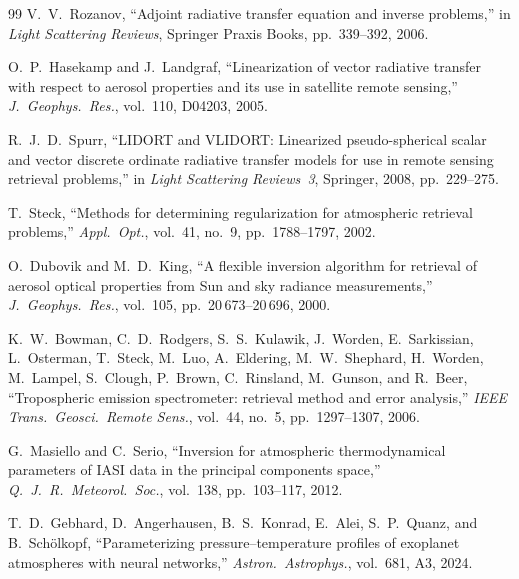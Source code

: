 \documentclass[11pt,a4paper]{article}
\theoremstyle{definition}
\begin{document}
\begin{thebibliography}{99}
  V.~V.~Rozanov,
  ``Adjoint radiative transfer equation and inverse problems,''
  in \emph{Light Scattering Reviews}, Springer Praxis Books,
  pp.~339--392, 2006.

  O.~P.~Hasekamp and J.~Landgraf,
  ``Linearization of vector radiative transfer with respect to aerosol
  properties and its use in satellite remote sensing,''
  \emph{J.\ Geophys.\ Res.}, vol.~110, D04203, 2005.

  R.~J.~D.~Spurr,
  ``LIDORT and VLIDORT: Linearized pseudo-spherical scalar and vector
  discrete ordinate radiative transfer models for use in remote sensing
  retrieval problems,''
  in \emph{Light Scattering Reviews~3}, Springer, 2008, pp.~229--275.

  T.~Steck,
  ``Methods for determining regularization for atmospheric retrieval
  problems,''
  \emph{Appl.\ Opt.}, vol.~41, no.~9, pp.~1788--1797, 2002.

  O.~Dubovik and M.~D.~King,
  ``A flexible inversion algorithm for retrieval of aerosol optical
  properties from Sun and sky radiance measurements,''
  \emph{J.\ Geophys.\ Res.}, vol.~105, pp.~20\,673--20\,696, 2000.

  K.~W.~Bowman, C.~D.~Rodgers, S.~S.~Kulawik, J.~Worden,
  E.~Sarkissian, L.~Osterman, T.~Steck, M.~Luo, A.~Eldering,
  M.~W.~Shephard, H.~Worden, M.~Lampel, S.~Clough, P.~Brown,
  C.~Rinsland, M.~Gunson, and R.~Beer,
  ``Tropospheric emission spectrometer: retrieval method and error
  analysis,''
  \emph{IEEE Trans.\ Geosci.\ Remote Sens.}, vol.~44, no.~5,
  pp.~1297--1307, 2006.

  G.~Masiello and C.~Serio,
  ``Inversion for atmospheric thermodynamical parameters of IASI data
  in the principal components space,''
  \emph{Q.~J.~R.\ Meteorol.\ Soc.}, vol.~138, pp.~103--117, 2012.

  T.~D.~Gebhard, D.~Angerhausen, B.~S.~Konrad, E.~Alei,
  S.~P.~Quanz, and B.~Sch\"olkopf,
  ``Parameterizing pressure--temperature profiles of exoplanet
  atmospheres with neural networks,''
  \emph{Astron.\ Astrophys.}, vol.~681, A3, 2024.

\end{thebibliography}
\end{document}

